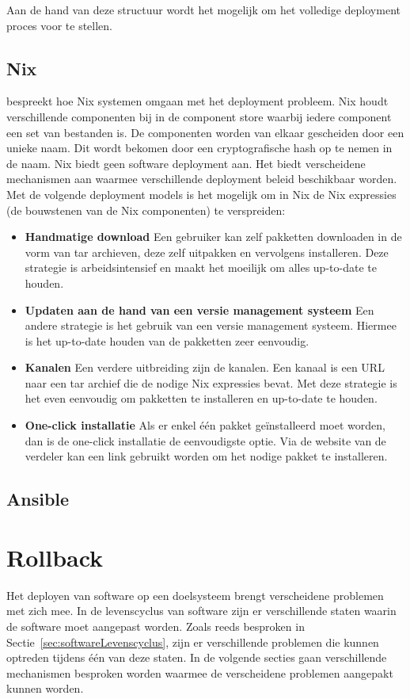 Aan de hand van deze structuur wordt het mogelijk om het volledige deployment proces voor te stellen.

\subsection{Nix}
\citet{dolstra2006purely} bespreekt hoe Nix systemen omgaan met het deployment probleem.
Nix houdt verschillende componenten bij in de component store waarbij iedere component een set van bestanden is.
De componenten worden van elkaar gescheiden door een unieke naam.
Dit wordt bekomen door een cryptografische hash op te nemen in de naam.
Nix biedt geen software deployment aan.
Het biedt verscheidene mechanismen aan waarmee verschillende deployment beleid beschikbaar worden.
Met de volgende deployment models is het mogelijk om in Nix de Nix expressies (de bouwstenen van de Nix componenten) te verspreiden:
\begin{itemize}
\item \textbf{Handmatige download} Een gebruiker kan zelf pakketten downloaden in de vorm van tar archieven, deze zelf uitpakken en vervolgens installeren.
Deze strategie is arbeidsintensief en maakt het moeilijk om alles up-to-date te houden. 
\item \textbf{Updaten aan de hand van een versie management systeem} Een andere strategie is het gebruik van een versie management systeem.
Hiermee is het up-to-date houden van de pakketten zeer eenvoudig.
\item \textbf{Kanalen} Een verdere uitbreiding zijn de kanalen.
Een kanaal is een URL naar een tar archief die de nodige Nix expressies bevat.
Met deze strategie is het even eenvoudig om pakketten te installeren en up-to-date te houden.
\item \textbf{One-click installatie} Als er enkel één pakket geïnstalleerd moet worden, dan is de one-click installatie de eenvoudigste optie.
Via de website van de verdeler kan een link gebruikt worden om het nodige pakket te installeren.
\end{itemize}

\subsection{Ansible}

\section{Rollback}\label{sec:rollback}
Het deployen van software op een doelsysteem brengt verscheidene problemen met zich mee.
In de levenscyclus van software zijn er verschillende staten waarin de software moet aangepast worden.
Zoals reeds besproken in Sectie~\vref{sec:softwareLevenscyclus}, zijn er verschillende problemen die kunnen optreden tijdens één van deze staten.
In de volgende secties gaan verschillende mechanismen besproken worden waarmee de verscheidene problemen aangepakt kunnen worden.

